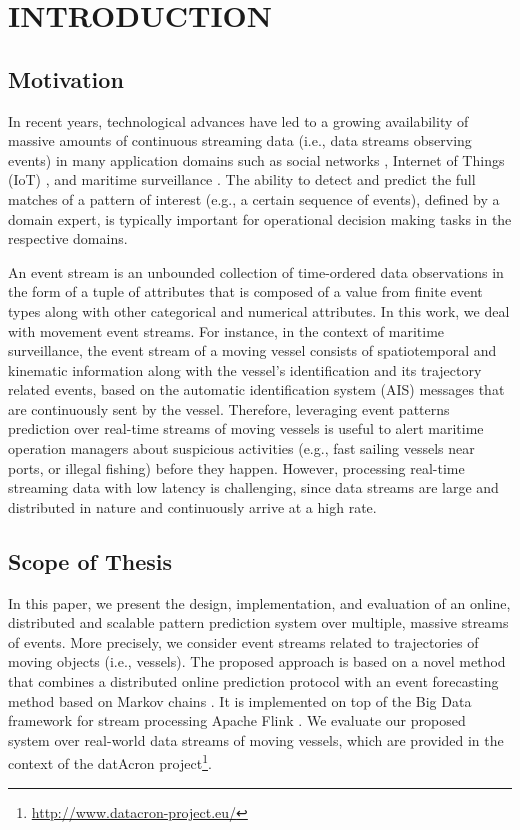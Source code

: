 \chapter{INTRODUCTION}


\section{Motivation}
\par In recent years, technological advances have led to a growing availability of massive amounts of continuous streaming data (i.e., data streams observing events) in many application domains such as social networks \cite{mathioudakis2010twittermonitor}, Internet of Things (IoT) \cite{miorandi2012internet}, and maritime surveillance \cite{patroumpas2015event}.  The ability to detect and predict the full matches of a pattern of interest (e.g., a certain sequence of events), defined by a domain expert, is typically important for operational decision making tasks in the respective domains.

\par An event stream is an unbounded collection of time-ordered data observations in the form of a tuple of attributes that is composed of a value from finite event types along with other categorical and numerical attributes. In this work, we deal with movement event streams. For instance, in the context of maritime surveillance, the event stream of a moving vessel consists of spatiotemporal and kinematic information along with the vessel's identification and its trajectory related events, based on the automatic identification system (AIS) \cite{ais} messages that are continuously sent by the vessel. Therefore, leveraging event patterns prediction over real-time streams of moving vessels is useful to alert maritime operation managers about suspicious activities (e.g., fast sailing vessels near ports, or illegal fishing) before they happen. However, processing real-time streaming data with low latency is challenging, since data streams are large and distributed in nature and continuously arrive at a high rate. 

\section{Scope of Thesis}
\par In this paper, we present the design, implementation, and evaluation  of an online, distributed and scalable pattern prediction system over multiple, massive streams of events. More precisely, we consider event streams related to trajectories of moving objects (i.e., vessels). The proposed approach is based on a novel method that combines a distributed online prediction protocol \cite{dekel2012optimal,kamp2014communication} with an event forecasting method based on Markov chains \cite{alevizos2017event}. It is implemented on top of the Big Data framework for stream processing Apache Flink \cite{Flink}. We evaluate our proposed system over real-world data streams of moving vessels, which are provided in the context of the datAcron project\footnote{\url{http://www.datacron-project.eu/}}.

